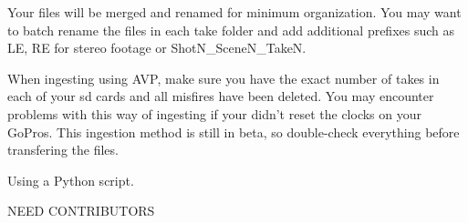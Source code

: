 \begin{fullwidth}
Your files will be merged and renamed for minimum organization. You may want to batch rename the files in each take folder and add additional prefixes such as LE, RE for stereo footage or ShotN\_SceneN\_TakeN.

\tip When ingesting using AVP, make sure you have the exact number of takes in each of your sd cards and all misfires have been deleted. You may encounter problems with this way of ingesting if your didn't reset the clocks on your GoPros. This ingestion method is still in beta, so double-check everything before transfering the files.

{\large Using a Python script. \par}

NEED CONTRIBUTORS

\clearpage
\end{fullwidth}
